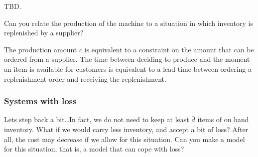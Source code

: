   \begin{solution}
    TBD.
  \end{solution}

\begin{question}
  Can you relate the production of the machine to a situation in which
  inventory is replenished by a supplier?
\end{question}

  \begin{solution}
    The production amount $c$ is equivalent to a constraint on the
    amount that can be ordered from a supplier. The time between
    deciding to produce and the moment an item is available for
    customers is equivalent to a lead-time between ordering a
    replenishment order and receiving the replenishment.
  \end{solution}


\subsubsection{Systems with loss}

\begin{question}
  Lets step back a bit\ldots In fact, we do not need to keep at least
  $\bar d$ items of on hand inventory. What if we would carry less
  inventory, and accept a bit of loss?  After all, the cost may
  decrease if we allow for this situation. Can you make a model for
  this situation, that is, a model that can cope with loss?
\end{question}

